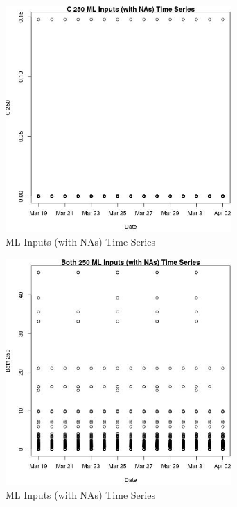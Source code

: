 \begin{figure} 
\centering  
\includegraphics[width=0.77\textwidth]{Code_Outputs/Report_ML_input_PM25_Step4_part_e_de_duplicated_aveswNAs_C_250vDate.jpg} 
\caption{\label{fig:Report_ML_input_PM25_Step4_part_e_de_duplicated_aveswNAsC_250vDate}ML Inputs (with NAs) Time Series} 
\end{figure} 
 

\clearpage 

\begin{figure} 
\centering  
\includegraphics[width=0.77\textwidth]{Code_Outputs/Report_ML_input_PM25_Step4_part_e_de_duplicated_aveswNAs_Both_250vDate.jpg} 
\caption{\label{fig:Report_ML_input_PM25_Step4_part_e_de_duplicated_aveswNAsBoth_250vDate}ML Inputs (with NAs) Time Series} 
\end{figure} 
 

